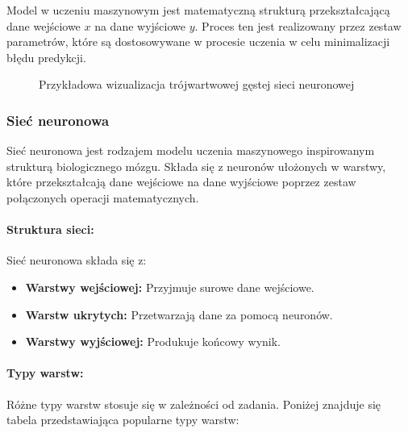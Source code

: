 Model w uczeniu maszynowym jest matematyczną strukturą przekształcającą dane wejściowe \(x\) na dane wyjściowe \(y\). Proces ten jest realizowany przez zestaw parametrów, które są dostosowywane w procesie uczenia w celu minimalizacji błędu predykcji.

\begin{figure}
	\begin{center}
	\end{center}
	\caption{Przykładowa wizualizacja trójwartwowej gęstej sieci neuronowej}
	\label{fig:neuron_layers}
\end{figure}

\subsubsection{Sieć neuronowa}

Sieć neuronowa jest rodzajem modelu uczenia maszynowego inspirowanym strukturą biologicznego mózgu. Składa się z neuronów ułożonych w warstwy, które przekształcają dane wejściowe na dane wyjściowe poprzez zestaw połączonych operacji matematycznych.

\paragraph{Struktura sieci:}
Sieć neuronowa składa się z:
\begin{itemize}
	\item \textbf{Warstwy wejściowej:} Przyjmuje surowe dane wejściowe.
	\item \textbf{Warstw ukrytych:} Przetwarzają dane za pomocą neuronów.
	\item \textbf{Warstwy wyjściowej:} Produkuje końcowy wynik.
\end{itemize}

\paragraph{Typy warstw:}
Różne typy warstw stosuje się w zależności od zadania. Poniżej znajduje się tabela przedstawiająca popularne typy warstw:

